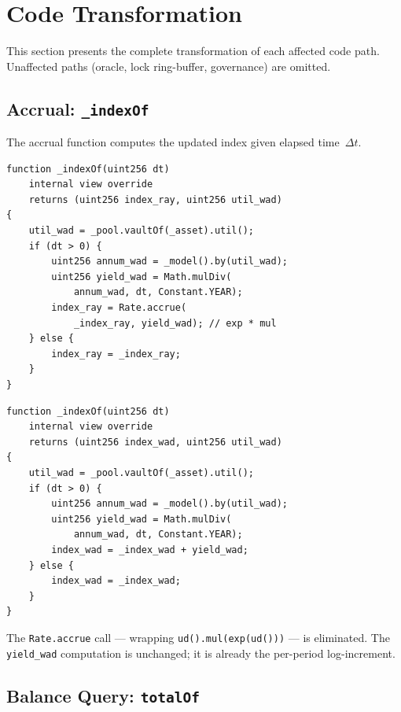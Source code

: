 \documentclass[10pt,a4paper,twocolumn]{article}
\begin{document}
\section{Code Transformation}
\label{sec:transformation}

This section presents the complete transformation of each affected code path. Unaffected paths (oracle, lock ring-buffer, governance) are omitted.

\subsection{Accrual: \texttt{\_indexOf}}
\label{subsec:indexof}

The accrual function computes the updated index given elapsed time~$\Delta t$.

\begin{lstlisting}[language=Solidity, caption={Multiplicative accrual (before)}, label={lst:indexof-ray}]
function _indexOf(uint256 dt)
    internal view override
    returns (uint256 index_ray, uint256 util_wad)
{
    util_wad = _pool.vaultOf(_asset).util();
    if (dt > 0) {
        uint256 annum_wad = _model().by(util_wad);
        uint256 yield_wad = Math.mulDiv(
            annum_wad, dt, Constant.YEAR);
        index_ray = Rate.accrue(
            _index_ray, yield_wad); // exp * mul
    } else {
        index_ray = _index_ray;
    }
}
\end{lstlisting}

\begin{lstlisting}[language=Solidity, caption={Log-space accrual (after)}, label={lst:indexof-log}]
function _indexOf(uint256 dt)
    internal view override
    returns (uint256 index_wad, uint256 util_wad)
{
    util_wad = _pool.vaultOf(_asset).util();
    if (dt > 0) {
        uint256 annum_wad = _model().by(util_wad);
        uint256 yield_wad = Math.mulDiv(
            annum_wad, dt, Constant.YEAR);
        index_wad = _index_wad + yield_wad;
    } else {
        index_wad = _index_wad;
    }
}
\end{lstlisting}

The \texttt{Rate.accrue} call --- wrapping \texttt{ud().mul(exp(ud()))} --- is eliminated. The \texttt{yield\_wad} computation is unchanged; it is already the per-period log-increment.

\subsection{Balance Query: \texttt{totalOf}}
\label{subsec:totalof}
\end{document}
